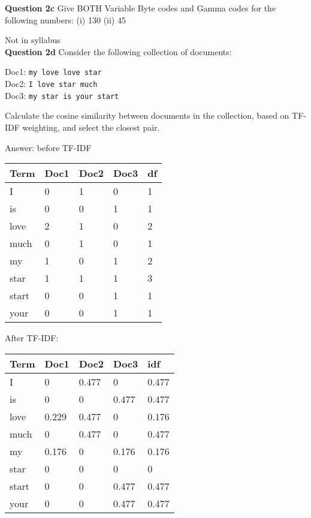 \documentclass[11pt,a4paper]{report}
\begin{document}
\begin{multicols*}{2}
\noindent \textbf{Question 2c} Give BOTH Variable Byte codes and Gamma codes for the following numbers: (i) 130 (ii) 45

\noindent Not in syllabus\\

\noindent \textbf{Question 2d} Consider the following collection of documents:
\begin{center}
Doc1: \verb|my love love star|\\
Doc2: \verb|I love star much|\\
Doc3: \verb|my star is your start|
\end{center}

\noindent Calculate the cosine similarity between documents in the collection, based on TF-IDF weighting, and select the closest pair.

\noindent Answer: before TF-IDF
\begin{center}
\begin{tabular}{ | l | l l l |l|} 
    \hline
    Term   & Doc1 & Doc2 & Doc3 & df \\
    \hline
    I      & 0    & 1    & 0    & 1  \\
    is     & 0    & 0    & 1    & 1  \\
    love   & 2    & 1    & 0    & 2  \\
    much   & 0    & 1    & 0    & 1  \\
    my     & 1    & 0    & 1    & 2  \\
    star   & 1    & 1    & 1    & 3  \\
    start  & 0    & 0    & 1    & 1  \\
    your   & 0    & 0    & 1    & 1  \\
    \hline
\end{tabular}
\end{center}

\noindent After TF-IDF:
\begin{center}
\begin{tabular}{ | l | l l l |l|} 
    \hline
    Term   & Doc1 & Doc2 & Doc3 & idf   \\
    \hline
    I      &0     &0.477 &0     & 0.477 \\
    is     &0     &0     &0.477 & 0.477 \\
    love   &0.229 &0.477 &0     & 0.176 \\
    much   &0     &0.477 &0     & 0.477 \\
    my     &0.176 &0     &0.176 & 0.176 \\
    star   &0     &0     &0     & 0     \\
    start  &0     &0     &0.477 & 0.477 \\
    your   &0     &0     &0.477 & 0.477 \\
    \hline
\end{tabular}
\end{center}


\end{multicols*}
\end{document}
